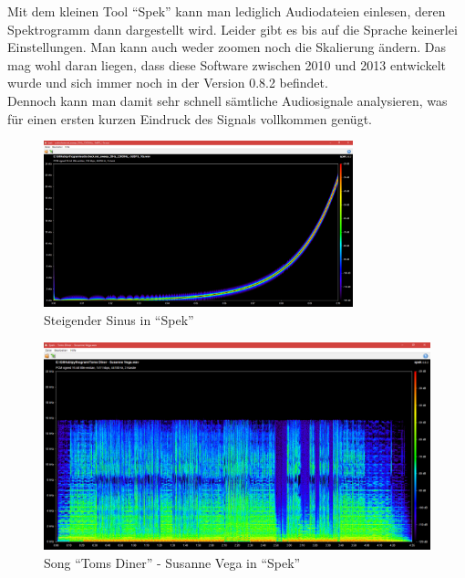 \documentclass[a4paper]{article}
\begin{document}
Mit dem kleinen Tool "`Spek"' kann man lediglich Audiodateien einlesen, deren Spektrogramm dann dargestellt wird. Leider gibt es bis auf die Sprache keinerlei Einstellungen. Man kann auch weder zoomen noch die Skalierung ändern. Das mag wohl daran liegen, dass diese Software zwischen 2010 und 2013 entwickelt wurde und sich immer noch in der Version 0.8.2 befindet.\\
Dennoch kann man damit sehr schnell sämtliche Audiosignale analysieren, was für einen ersten kurzen Eindruck des Signals vollkommen genügt.\vspace{2em}
\begin{figure}[H]
    \centering
    \begin{minipage}{1.0\textwidth}
        \centering
        \includegraphics[width=0.8\textwidth]{Spek_Sine_Sweep.png}
        \caption{Steigender Sinus in "`Spek"'}
    \end{minipage}\hfill
\end{figure}
\begin{figure}[H]
    \centering
    \begin{minipage}{1.0\textwidth}
        \centering
        \includegraphics[width=1.0\textwidth]{Spek_Toms_Diner.png}
        \caption{Song "`Toms Diner"' - Susanne Vega in "`Spek"'}
    \end{minipage}
\end{figure}
\newpage
\end{document}
